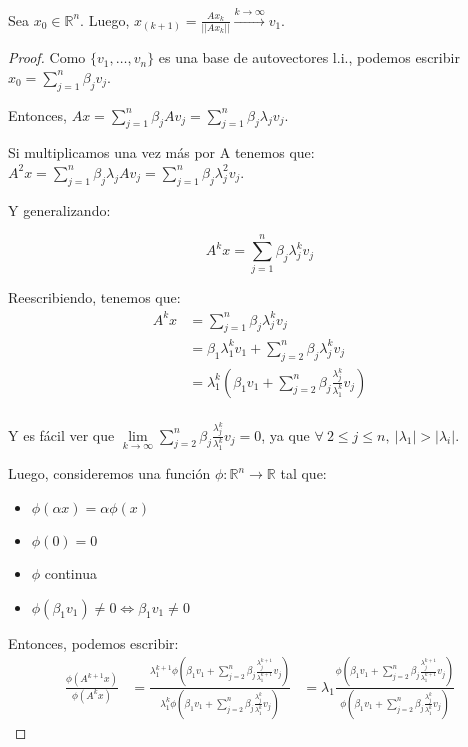 \begin{proposition}
    Sea $x_0 \in \mathbb{R}^{n}$. Luego, $x_{(k+1)} = \frac{Ax_k}{||Ax_k||} \xrightarrow{k \to \infty} v_1$.
\end{proposition}
\begin{proof}

Como $\{v_1, \dots, v_n\}$ es una base de autovectores l.i., podemos escribir $x_0 = \sum\limits_{j=1}^{n}{\beta_j v_j}$.

Entonces, $Ax = \sum\limits_{j=1}^{n}{\beta_j A v_j} = \sum\limits_{j=1}^{n}{\beta_j \lambda_j v_j}$.

Si multiplicamos una vez más por A tenemos que: $A^2x = \sum\limits_{j=1}^{n}{\beta_j \lambda_j A v_j} = \sum\limits_{j=1}^{n}{\beta_j \lambda_j^2 v_j}$.

Y generalizando:

$$A^kx = \sum\limits_{j=1}^{n}{\beta_j \lambda_j^k v_j}$$

Reescribiendo, tenemos que:
\begin{equation*}
        \begin{aligned}
        A^kx &= \sum\limits_{j=1}^{n}{\beta_j \lambda_j^k v_j} \\
             &= \beta_1 \lambda_1^k v_1 +\sum\limits_{j=2}^{n}{\beta_j \lambda_j^k v_j} \\
             &= \lambda_1^k \left(\beta_1 v_1 +\sum\limits_{j=2}^{n}{\beta_j \frac{\lambda_j^k}{\lambda_1^k} v_j} \right) \\
        \end{aligned}
\end{equation*}

Y es fácil ver que $\lim\limits_{k \to \infty} \sum\limits_{j=2}^{n}{\beta_j \frac{\lambda_j^k}{\lambda_1^k} v_j} = 0$,
ya que $\forall\ 2\leq j\leq n,\ |\lambda_1| > |\lambda_i|$.

Luego, consideremos una función $\phi:\mathbb{R}^{n}\to \mathbb{R}$ tal que:
\begin{itemize}
    \item $\phi(\alpha x) = \alpha \phi(x)$
    \item $\phi(0) = 0$
    \item $\phi$ continua
    \item $\phi(\beta_1 v_1) \neq 0 \iff \beta_1 v_1 \neq 0$
\end{itemize}

Entonces, podemos escribir:
\begin{equation*}
        \begin{aligned}
        \frac{\phi(A^{k+1}x)}{\phi(A^kx)}
            &= \frac{\lambda_1^{k+1} \phi\left(\beta_1 v_1 +\sum\limits_{j=2}^{n}{\beta_j \frac{\lambda_j^{k+1}}{\lambda_1^{k+1}} v_j} \right)}
                {\lambda_1^k \phi\left(\beta_1 v_1 +\sum\limits_{j=2}^{n}{\beta_j \frac{\lambda_j^k}{\lambda_1^k} v_j} \right)}
            &= \lambda_1\frac{\phi\left(\beta_1 v_1 +\sum\limits_{j=2}^{n}{\beta_j \frac{\lambda_j^{k+1}}{\lambda_1^{k+1}} v_j} \right)}
                    {\phi\left(\beta_1 v_1 +\sum\limits_{j=2}^{n}{\beta_j \frac{\lambda_j^k}{\lambda_1^k} v_j} \right)}
        \end{aligned}
\end{equation*}


\end{proof}
